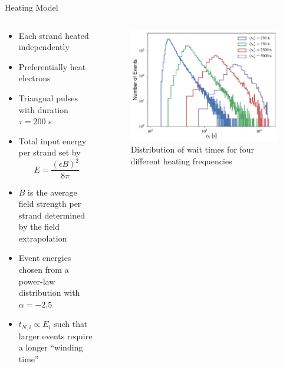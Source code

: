 \documentclass[final]{beamer}
\begin{document}
\begin{frame}
\begin{columns}[T]
\begin{column}{0.49\linewidth}
    \begin{block}{Heating Model}
      \begin{columns}[T]
      \begin{column}{0.49\columnwidth}
        \begin{itemize}
        \item Each strand heated independently
        \item Preferentially heat electrons
        \item Triangual pulses with duration $\tau=200$ s
        \item Total input energy per strand set by 
              \begin{equation*}
                E = \frac{(\epsilon B)^2}{8\pi}
              \end{equation*}
        \item $B$ is the average field strength per strand determined by the field extrapolation
        \item Event energies chosen from a power-law distribution with $\alpha=-2.5$
        \item $t_{N,i}\propto E_i$ such that larger events require a longer ``winding time''
        \end{itemize}
      \end{column}
      \begin{column}{0.49\columnwidth}
        \begin{figure}
        \includegraphics[width=\columnwidth]{figures/wait_time_distributions.pdf}
        \caption{Distribution of wait times for four different heating frequencies}

\end{figure}
\end{column}
\end{columns}
\end{block}
\end{column}
\end{columns}
\end{frame}
\end{document}
